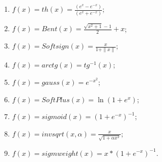 \documentclass[]{article}
\makeatletter
\newcommand{\xslalph}[1]{\expandafter\@xslalph\csname c@#1\endcsname}
\newcommand{\@xslalph}[1]{%
    \ifcase#1\or а\or б\or в\or г\or д\or e\or є\or ж\or з\or i%
    \or й\or к\or л\or м\or н\or о\or п\or р\or с\or т%
    \or у\or ф\or х\or ц\or ч\or ш\or ю\or я\or аа\or бб\or вв %
    \else\@ctrerr\fi%
}
\makeatother
\begin{document}
\begin{enumerate}
  \begin{enumerate}[label=\xslalph*)]
  \item   \(f(x) = th(x) = \frac{(e^{x} - e^{-x})}{(e^{x} + e^{-x})}\);
\item \(f(x) = Bent(x) = \frac{\sqrt{x^{2} + 1} - 1}{2} + x\);
\item \(f(x) = Softsign(x) = \frac{x}{1 + \|x\|}\);
\item \(f(x) = arctg(x) = tg^{-1}(x)\);
\item\(f(x) = gauss(x) = e^{-x^{2}}\);
\item \(f(x) = SoftPlus(x) = \ln(1 + e^{x})\);
\item \(f(x) = sigmoid(x) = {(1 + e^{-x})}^{-1}\);
\item \(f(x) = invsqrt(x,\alpha) = \frac{x}{\sqrt{1 + \alpha x^{2}}}\);
\item\(f(x) = sigmweight(x) = x*{(1 + e^{-x})}^{-1}\).

 \end{enumerate}
\end{enumerate}
\end{document}
